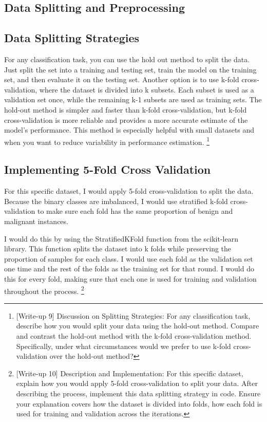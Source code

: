 \documentclass{labReport}
\begin{document}
\begin{multicols*}{2}
    \section{Data Splitting and Preprocessing}

    \subsection{Data Splitting Strategies}
    For any classification task, you can use the hold out method to split the data. Just split the set into a training and testing set, train the model on the training set, and then evaluate it on the testing set. Another option is to use k-fold cross-validation, where the dataset is divided into k subsets. Each subset is used as a validation set once, while the remaining k-1 subsets are used as training sets. The hold-out method is simpler and faster than k-fold cross-validation, but k-fold cross-validation is more reliable and provides a more accurate estimate of the model's performance. This method is especially helpful with small datasets and when you want to reduce variability in performance estimation. \footnote{[Write-up 9] Discussion on Splitting Strategies: For any classification task, describe how you would split your data using the hold-out method. Compare and contrast the hold-out method with the k-fold cross-validation method. Specifically, under what circumstances would we prefer to use k-fold cross-validation over the hold-out method?}

    \subsection{Implementing 5-Fold Cross Validation}
    For this specific dataset, I would apply 5-fold cross-validation to split the data. Because the binary classes are imbalanced, I would use stratified k-fold cross-validation to make sure each fold has the same proportion of benign and malignant instances.

    I would do this by using the StratifiedKFold function from the scikit-learn library. This function splits the dataset into k folds while preserving the proportion of samples for each class. I would use each fold as the validation set one time and the rest of the folds as the training set for that round. I would do this for every fold, making sure that each one is used for training and validation throughout the process. \footnote{[Write-up 10] Description and Implementation: For this specific dataset, explain how you would apply 5-fold cross-validation to split your data. After describing the process, implement this data splitting strategy in code. Ensure your explanation covers how the dataset is divided into folds, how each fold is used for training and validation across the iterations.}


\end{multicols*}
\end{document}
